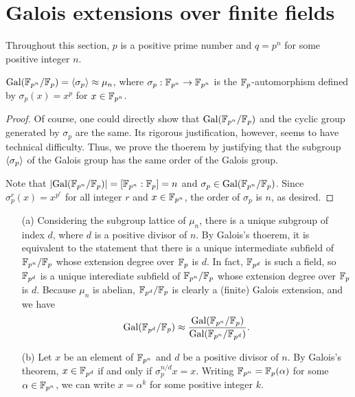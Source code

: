 \section{Galois extensions over finite fields}

Throughout this section, $p$ is a positive prime number and $q=p^n$ for some positive integer $n$.

\begin{thm}
    ${\textrm{Gal}({{\mathbb{F}}_{p^n}/{\mathbb{F}}_p})}={\left\langle{\sigma_p}\right\rangle}\approx \mu_n$, where $\sigma_p: {\mathbb{F}}_{p^n}\rightarrow{\mathbb{F}}_{p^n}$ is the ${\mathbb{F}}_p$-automorphism defined by $\sigma_p(x)=x^p$ for $x\in{\mathbb{F}}_{p^n}$.
\end{thm}
\begin{proof}
    Of course, one could directly show that ${\textrm{Gal}({{\mathbb{F}}_{p^n}/{\mathbb{F}}_p})}$ and the cyclic group generated by $\sigma_p$ are the same.
    Its rigorous justification, however, seems to have technical difficulty.
    Thus, we prove the thoerem by justifying that the subgroup ${\left\langle{\sigma_p}\right\rangle}$ of the Galois group has the same order of the Galois group.

    Note that $|{\textrm{Gal}({{\mathbb{F}}_{p^n}/{\mathbb{F}}_p})}|=[{\mathbb{F}}_{p^n}: {\mathbb{F}}_p]=n$ and $\sigma_p\in {\textrm{Gal}({{\mathbb{F}}_{p^n}/{\mathbb{F}}_p})}$.
    Since $\sigma_p^r(x)=x^{p^r}$ for all integer $r$ and $x\in {\mathbb{F}}_{p^n}$, the order of $\sigma_p$ is $n$, as desired.
\end{proof}
\begin{obs}
    \begin{enumerate}
        \item[(a)]
        {
            Considering the subgroup lattice of $\mu_n$, there is a unique subgroup of index $d$, where $d$ is a positive divisor of $n$.
            By Galois's thoerem, it is equivalent to the statement that there is a unique intermediate subfield of ${\mathbb{F}}_{p^n}/{\mathbb{F}}_p$ whose extension degree over ${\mathbb{F}}_p$ is $d$.
            In fact, ${\mathbb{F}}_{p^d}$ is such a field, so ${\mathbb{F}}_{p^d}$ is a unique interediate subfield of ${\mathbb{F}}_{p^n}/{\mathbb{F}}_p$ whose extension degree over ${\mathbb{F}}_p$ is $d$.
            Because $\mu_n$ is abelian, ${\mathbb{F}}_{p^d}/{\mathbb{F}}_p$ is clearly a (finite) Galois extension, and we have
            \begin{align*}
                {\textrm{Gal}({{\mathbb{F}}_{p^d}/{\mathbb{F}}_p})}\approx\frac{{\textrm{Gal}({{\mathbb{F}}_{p^n}/{\mathbb{F}}_p})}}{{\textrm{Gal}({{\mathbb{F}}_{p^n}/{\mathbb{F}}_{p^d}})}}.
            \end{align*}        
        }
        \item[(b)]
        {
            Let $x$ be an element of ${\mathbb{F}}_{p^n}$ and $d$ be a positive divisor of $n$.
            By Galois's theorem, $x\in{\mathbb{F}}_{p^d}$ if and only if $\sigma_p^{n/d} x=x$.
            Writing ${\mathbb{F}}_{p^n}={\mathbb{F}}_p(\alpha)$ for some $\alpha\in{\mathbb{F}}_{p^n}$, we can write $x=\alpha^k$ for some positive integer $k$.
        }
    \end{enumerate}
\end{obs}

